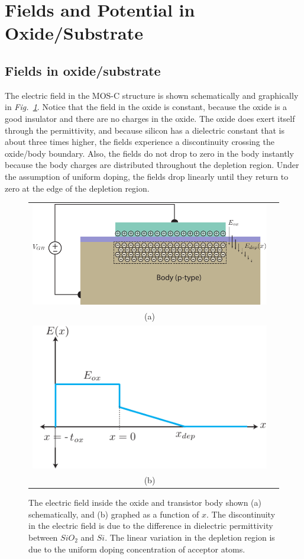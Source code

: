 \section{Fields and Potential in Oxide/Substrate}
\subsection{Fields in oxide/substrate}
The electric field in the MOS-C structure is shown schematically and graphically in \emph{Fig.~\ref{fig:mos_field_oxide_semi}}.  Notice that the field in the oxide is constant, because the oxide is a good insulator and there are no charges in the oxide.  The oxide does exert itself through the permittivity, and because silicon has a dielectric constant that is about three times higher, the fields experience a discontinuity crossing the oxide/body boundary.  Also, the fields do not drop to zero in the body instantly because the body charges are distributed throughout the depletion region.  Under the assumption of uniform doping, the fields drop linearly until they return to zero at the edge of the depletion region.   
\begin{figure}[H]
\centering
\begin{tabular}{cc}
\includegraphics[width=.61\columnwidth]{mos_cap_Efields}\\
(a)\\
\includegraphics[width=.51\columnwidth]{MOS_E_field}\\
(b)\\
\end{tabular}
\caption{The electric field inside the oxide and transistor body shown (a) schematically, and (b) graphed as a function of $x$.  The discontinuity in the electric field is due to the difference in dielectric permittivity between $SiO_2$ and $Si$.  The linear variation in the depletion region is due to the uniform doping concentration of acceptor atoms.}
\label{fig:mos_field_oxide_semi}
\end{figure}
